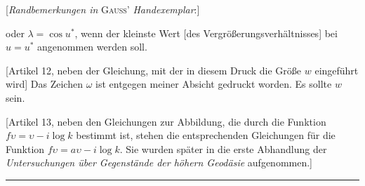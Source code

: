 \par\bigskip{}
\begin{center}[\textit{Randbemerkungen in} \textsc{Gauss}' \textit{Handexemplar}:]\end{center}
\begingroup\small
\par{} oder \(\lambda=\cos u^*\), wenn der kleinste Wert [des Vergrößerungsverhältnisses] bei \(u=u^*\) angenommen werden soll.

[Artikel 12, neben der Gleichung, mit der in diesem Druck die Größe \(w\) eingeführt wird] Das Zeichen \(\omega\) ist entgegen meiner Absicht gedruckt worden. Es sollte \(w\) sein.

[Artikel 13, neben den Gleichungen zur Abbildung, die durch die Funktion \(f\upsilon=\upsilon-i\log k\) bestimmt ist, stehen die entsprechenden Gleichungen für die Funktion \(f\upsilon=a\upsilon-i\log k\). Sie wurden später in die erste Abhandlung der \textit{Untersuchungen über Gegenstände der höhern Geodäsie} aufgenommen.]
\par\endgroup
\begin{center}\rule{1.2in}{.3pt}\end{center}

